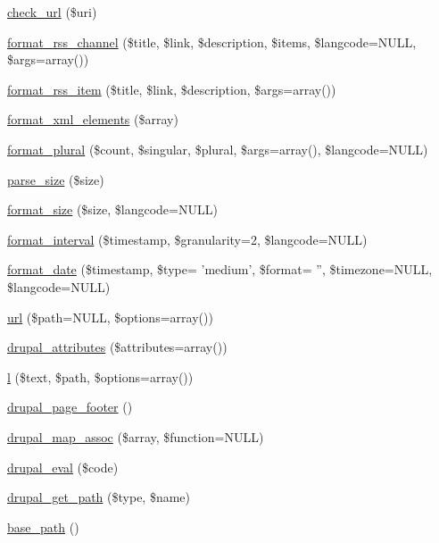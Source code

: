 \begin{CompactItemize}
\item 
\hyperlink{common_8inc_c024315b69035ef05c33674838707919}{check\_\-url} (\$uri)
\item 
\hyperlink{group__format_g44992b971aed4a6a5b8457678f57de50}{format\_\-rss\_\-channel} (\$title, \$link, \$description, \$items, \$langcode=NULL, \$args=array())
\item 
\hyperlink{group__format_g4ecc9b876a9eaa65abb24ef513b217ad}{format\_\-rss\_\-item} (\$title, \$link, \$description, \$args=array())
\item 
\hyperlink{group__format_gfb344c648e6b63c35950d2889430e4c7}{format\_\-xml\_\-elements} (\$array)
\item 
\hyperlink{group__format_g0acb4fb7ab13d4b5ca3267a253af2f74}{format\_\-plural} (\$count, \$singular, \$plural, \$args=array(), \$langcode=NULL)
\item 
\hyperlink{group__format_g08382023ada29bae2a6a94f22196b066}{parse\_\-size} (\$size)
\item 
\hyperlink{group__format_g2a0075e7646fa2f399286272faa2956e}{format\_\-size} (\$size, \$langcode=NULL)
\item 
\hyperlink{group__format_g583fbfbb3172036bef0b15bfa525679a}{format\_\-interval} (\$timestamp, \$granularity=2, \$langcode=NULL)
\item 
\hyperlink{group__format_g40553742a67f9c79c4669b9053fe202c}{format\_\-date} (\$timestamp, \$type= 'medium', \$format= '', \$timezone=NULL, \$langcode=NULL)
\item 
\hyperlink{common_8inc_7ef60c766e2d09e18b866dacf6b9eb1f}{url} (\$path=NULL, \$options=array())
\item 
\hyperlink{common_8inc_fcc26495094c3ea765071dfdc925ac27}{drupal\_\-attributes} (\$attributes=array())
\item 
\hyperlink{common_8inc_b1b47d5ab720066df684c335eda75cfd}{l} (\$text, \$path, \$options=array())
\item 
\hyperlink{common_8inc_64bc7d539a74e850935d73968788abd3}{drupal\_\-page\_\-footer} ()
\item 
\hyperlink{common_8inc_72b55fe42aa726cc506660138abd3307}{drupal\_\-map\_\-assoc} (\$array, \$function=NULL)
\item 
\hyperlink{common_8inc_97f587c4db32bc29e946f713b0c4be34}{drupal\_\-eval} (\$code)
\item 
\hyperlink{common_8inc_e3bbe8f97bf07bb0eaf4580c98f9bf94}{drupal\_\-get\_\-path} (\$type, \$name)
\item 
\hyperlink{common_8inc_e227697e9c239f09fd7e36f71afde771}{base\_\-path} ()

\end{CompactItemize}
